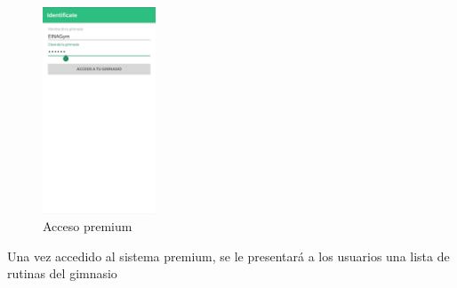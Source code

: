 \documentclass[11pt,a4paper]{report}
\begin{document}
\begin{figure}[H]
	\centering
	\includegraphics[width=0.3\textwidth]{graficos/manual/IdentificacionPremium.jpg}
	\caption{Acceso premium}
\end{figure}
Una vez accedido al sistema premium, se le presentará a los usuarios una lista de rutinas del gimnasio
\end{document}
